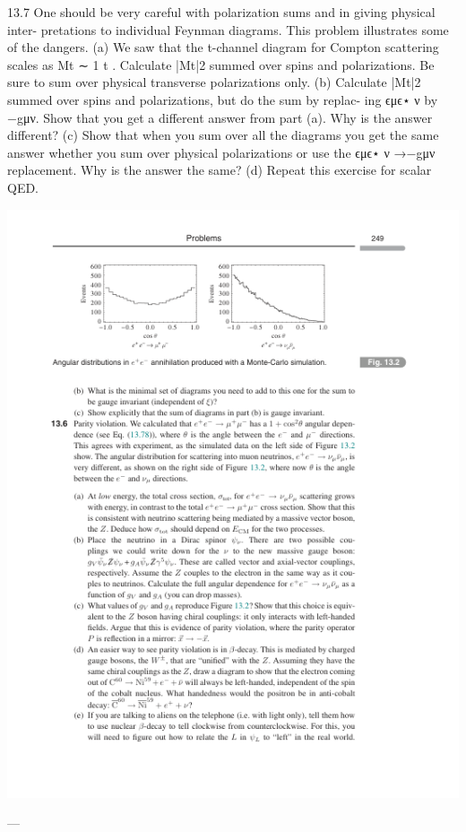 13.7 One should be very careful with polarization sums and in giving physical inter-
pretations to individual Feynman diagrams. This problem illustrates some of the
dangers.
(a) We saw that the t-channel diagram for Compton scattering scales as Mt ∼
1
t . Calculate |Mt|2 summed over spins and polarizations. Be sure to sum over
physical transverse polarizations only.
(b) Calculate |Mt|2 summed over spins and polarizations, but do the sum by replac-
ing ϵμϵ⋆
ν by −gμν. Show that you get a different answer from part (a). Why is
the answer different?
(c) Show that when you sum over all the diagrams you get the same answer whether
you sum over physical polarizations or use the ϵμϵ⋆
ν →−gμν replacement. Why
is the answer the same?
(d) Repeat this exercise for scalar QED.

\includegraphics{./figs/13_Quantum_electrodynamics_page_269.png}

---

